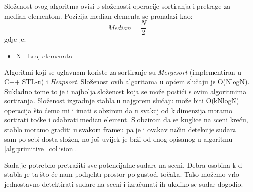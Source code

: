 Složenost ovog algoritma ovisi o složenosti operacije sortiranja i pretrage za median elementom. Pozicija median elementa se pronalazi kao:
\begin{equation}
	Median =\frac{N}{2}
\end{equation}
gdje je:
\begin{itemize}
	\item N - broj elemenata
\end{itemize}
Algoritmi koji se uglavnom koriste za sortiranje su \emph{Mergesort} (implementiran u C++ STL-u) i \emph{Heapsort}. Složenost ovih algoritama u općem slučaju je O(NlogN). Sukladno tome to je i najbolja složenost koja se može postići s ovim algoritmima sortiranja. Složenost izgradnje stabla u najgorem slučaju može biti O(kNlogN) operacija što ćemo mi i imati s obzirom da u svakoj od k dimenzija moramo sortirati točke i odabrati median element. S obzirom da se kuglice na sceni kreću, stablo moramo graditi u svakom frameu pa je i ovakav način detekcije sudara sam po sebi dosta složen, no još uvijek je brži od onog opisanog u algoritmu \ref{alg:primitive_collision}. 

Sada je potrebno pretražiti sve potencijalne sudare na sceni. Dobra osobina k-d stabla je ta što će nam podijeliti prostor po gustoći točaka. Tako možemo vrlo jednostavno detektirati sudare na sceni i izračunati ih ukoliko se sudar dogodio.

